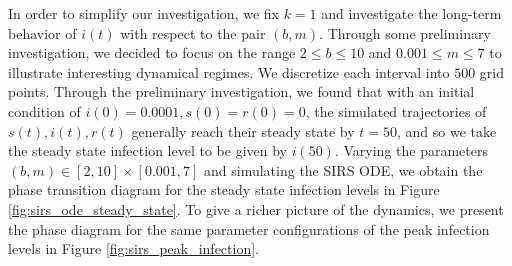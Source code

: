 \documentclass[12pt, reqno]{amsart}
\begin{document}
    In order to simplify our investigation, we fix \(k = 1\) and investigate the long-term behavior of \(i(t)\) with respect to the pair \((b, m)\). Through some preliminary investigation, we decided to focus on the range \(2 \leq b \leq 10\) and \(0.001 \leq m \leq 7\) to illustrate interesting dynamical regimes. We discretize each interval into \(500\) grid points. Through the preliminary investigation, we found that with an initial condition of \(i(0) = 0.0001, s(0)=r(0)=0\), the simulated trajectories of \(s(t), i(t), r(t)\) generally reach their steady state by \(t = 50\), and so we take the steady state infection level to be given by \(i(50)\). Varying the parameters \((b, m) \in [2, 10] \times [0.001, 7]\) and simulating the SIRS ODE, we obtain the phase transition diagram for the steady state infection levels in Figure \ref{fig:sirs_ode_steady_state}. To give a richer picture of the dynamics, we present the phase diagram for the same parameter configurations of the peak infection levels in Figure \ref{fig:sirs_peak_infection}.
\end{document}
